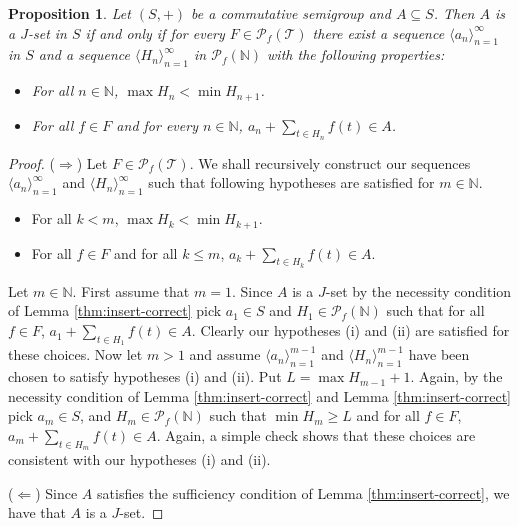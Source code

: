 \documentclass[12pt]{article}
\theoremstyle{plain}
\newtheorem{prop}[thm]{Proposition}
\theoremstyle{definition}
\newcommand{\la}{\langle}
\newcommand{\ra}{\rangle}
\newcommand{\bbN}{\mathbb{N}}
\newcommand{\calT}{\mathcal{T}}
\newcommand{\Pf}{\mathcal{P}_f}
\begin{document}
\begin{prop}
  \label{prop:many-translates}
  Let $(S, +)$ be a commutative semigroup and $A \subseteq S$.
  Then $A$ is a $J$-set in $S$ if and only if for every $F \in
  \Pf(\calT)$ there exist a sequence $\la a_n \ra_{n=1}^\infty$ in $S$
  and a sequence $\la H_n \ra_{n=1}^\infty$ in $\Pf(\bbN)$ with the
  following properties:
  \begin{itemize}
    \item[(1)] For all $n \in \bbN$, $\max H_n < \min H_{n+1}$. 

    \item[(2)] For all $f \in F$ and for every $n \in \bbN$, $a_n + \sum_{t \in H_n} f(t) \in A$.
  \end{itemize}
\end{prop}
\begin{proof}
  ($\Rightarrow$)
  Let $F \in \Pf(\calT)$.
  We shall recursively construct our sequences $\la a_n
  \ra_{n=1}^\infty$ and $\la H_n \ra_{n=1}^\infty$ such that following
  hypotheses are satisfied for $m\in \bbN$.
  \begin{itemize}
    \item[(i)] For all $k < m$, $\max H_k < \min H_{k+1}$.
    \item[(ii)] For all $f \in F$ and for all $k \le m$, $a_k + \sum_{t \in  H_k} f(t) \in A$.
  \end{itemize}

  Let $m \in \bbN$.
  First assume that $m = 1$.
  Since $A$ is a $J$-set by the necessity condition of Lemma \ref{thm:insert-correct} pick $a_1 \in S$ and $H_1 \in \Pf(\bbN)$ such that for all $f \in F$, $a_1 + \sum_{t \in H_1} f(t) \in A$. 
  Clearly our hypotheses (i) and (ii) are satisfied for these choices.
  Now let $m > 1$ and assume $\la a_n \ra_{n=1}^{m-1}$ and $\la H_n
  \ra_{n=1}^{m-1}$ have been chosen to satisfy hypotheses (i) and
  (ii).
  Put $L = \max H_{m-1} + 1$. 
  Again, by the necessity condition of Lemma \ref{thm:insert-correct} and Lemma \ref{thm:insert-correct} pick $a_m \in S$, and $H_m \in \Pf(\bbN)$ such that $\min H_m \ge L$ and for all $f \in F$, $a_m + \sum_{t \in H_m} f(t) \in A$.
  Again, a simple check shows that these choices are consistent with
  our hypotheses (i) and (ii).

  ($\Leftarrow$) Since $A$ satisfies the sufficiency condition of Lemma \ref{thm:insert-correct}, we have that $A$ is a $J$-set. 
\end{proof}
\end{document}
